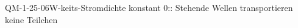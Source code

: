 
\begin{CONC}{QM-1-25-06}{W-keits-Stromdichte konstant 0:: Stehende Wellen transportieren keine Teilchen}
\end{CONC}
